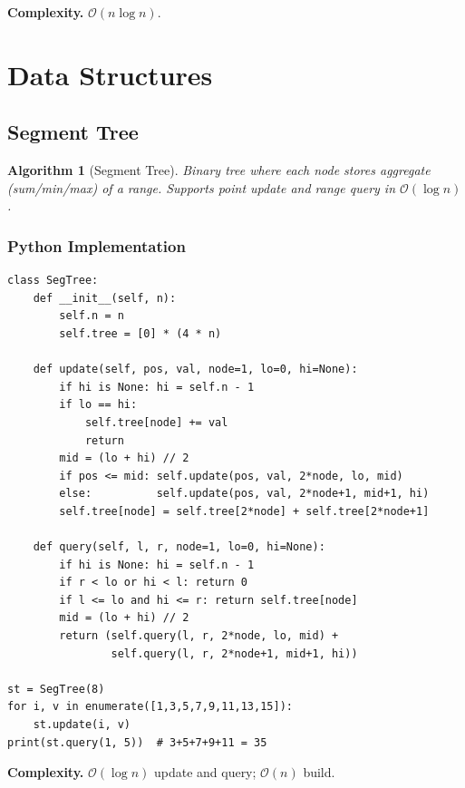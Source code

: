 \documentclass[10pt,a4paper]{article}
\theoremstyle{cpstyle}
\newtheorem{algorithm}[theorem]{Algorithm}
\newcommand{\bigO}[1]{\mathcal{O}\!\left(#1\right)}
\begin{document}
\textbf{Complexity.} $\bigO{n \log n}$.

\clearpage
\section{Data Structures}

\subsection{Segment Tree}

\begin{algorithm}[Segment Tree]
Binary tree where each node stores aggregate (sum/min/max) of a range. Supports point update and range query in $\bigO{\log n}$.
\end{algorithm}

\subsubsection{Python Implementation}
\begin{lstlisting}[caption={Segment Tree -- range sum with point update}]
class SegTree:
    def __init__(self, n):
        self.n = n
        self.tree = [0] * (4 * n)

    def update(self, pos, val, node=1, lo=0, hi=None):
        if hi is None: hi = self.n - 1
        if lo == hi:
            self.tree[node] += val
            return
        mid = (lo + hi) // 2
        if pos <= mid: self.update(pos, val, 2*node, lo, mid)
        else:          self.update(pos, val, 2*node+1, mid+1, hi)
        self.tree[node] = self.tree[2*node] + self.tree[2*node+1]

    def query(self, l, r, node=1, lo=0, hi=None):
        if hi is None: hi = self.n - 1
        if r < lo or hi < l: return 0
        if l <= lo and hi <= r: return self.tree[node]
        mid = (lo + hi) // 2
        return (self.query(l, r, 2*node, lo, mid) +
                self.query(l, r, 2*node+1, mid+1, hi))

st = SegTree(8)
for i, v in enumerate([1,3,5,7,9,11,13,15]):
    st.update(i, v)
print(st.query(1, 5))  # 3+5+7+9+11 = 35
\end{lstlisting}

\textbf{Complexity.} $\bigO{\log n}$ update and query; $\bigO{n}$ build.

\end{document}
